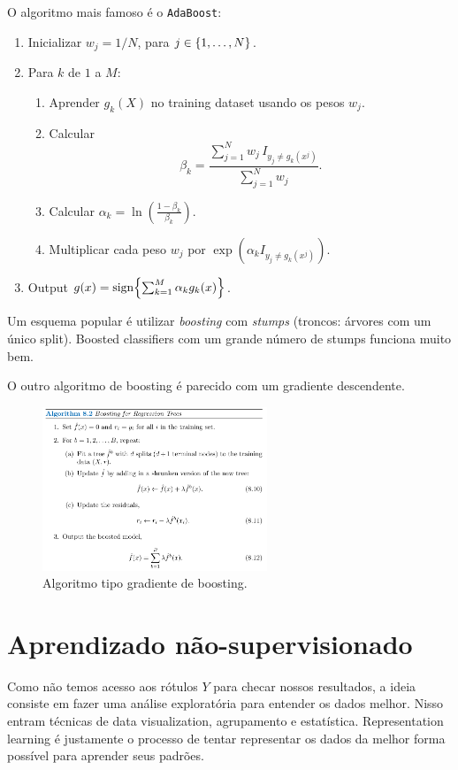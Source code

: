 \documentclass[a4paper,fleqn,12pt]{article}
\begin{document}
O algoritmo mais famoso é o \texttt{AdaBoost}:
\begin{enumerate}
\item Inicializar $w_j = 1/N$, para $j \in \qty{1,\ldots,N}$.
\item Para $k$ de $1$ a $M$:
\begin{enumerate}
\item Aprender $g_k(X)$ no training dataset usando os pesos $w_j$.
\item Calcular
$$
\beta_k = \frac{\sum_{j=1}^{N} w_j \, I_{y_j \neq g_k(x^j)}}{\sum_{j=1}^{N} w_j}.
$$
\item Calcular $\alpha_k = \ln(\frac{1-\beta_k}{\beta_k})$.
\item Multiplicar cada peso $w_j$ por $\exp(\alpha_k I_{y_j \neq g_k(x^j)})$.
\end{enumerate}
\item Output $g(x) = \text{sign}\qty{\sum_{k=1}^{M} \alpha_k g_k(x)}$.
\end{enumerate}

Um esquema popular é utilizar \textit{boosting} com \textit{stumps} (troncos: árvores com um único split). Boosted classifiers com um grande número de stumps funciona muito bem.

O outro algoritmo de boosting é parecido com um gradiente descendente.

\begin{figure}[H]
\centering
\includegraphics[width=0.6\textwidth]{fig/boosting_algo.png}
\caption{Algoritmo tipo gradiente de boosting.}
\label{fig:boosting_algo}
\end{figure}

\section{Aprendizado não-supervisionado}

Como não temos acesso aos rótulos $Y$ para checar nossos resultados, a ideia consiste em fazer uma análise exploratória para entender os dados melhor. Nisso entram técnicas de data visualization, agrupamento e estatística. Representation learning é justamente o processo de tentar representar os dados da melhor forma possível para aprender seus padrões.
\end{document}
